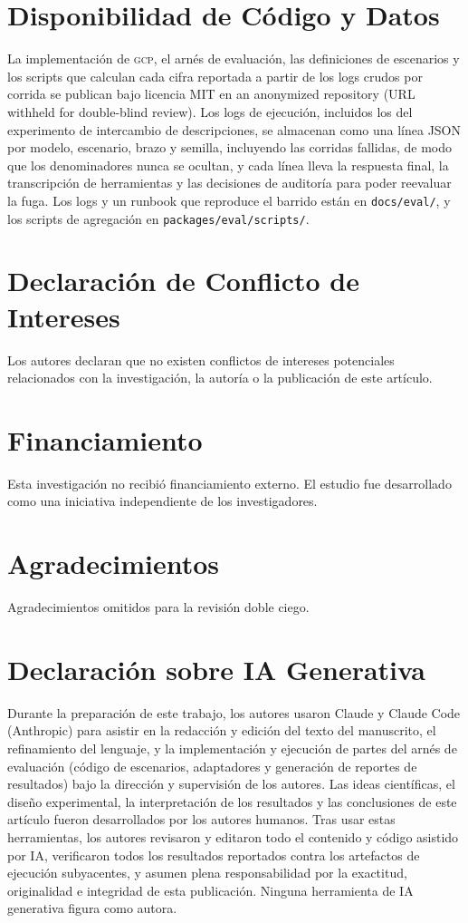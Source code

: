 \documentclass[conference,letterpaper]{IEEEtran}
\newcommand{\gcp}{\textsc{gcp}}
\begin{document}
\section*{Disponibilidad de Código y Datos}
\label{sec:availability}
La implementación de \gcp{}, el arnés de evaluación, las definiciones de escenarios y los scripts que calculan cada cifra reportada a partir de los logs crudos por corrida se publican bajo licencia MIT en
an anonymized repository (URL withheld for double-blind review). Los logs de ejecución, incluidos los del experimento de intercambio de
descripciones, se almacenan como una línea JSON por modelo, escenario, brazo y semilla, incluyendo las
corridas fallidas, de modo que los denominadores nunca se ocultan, y cada línea lleva la respuesta
final, la transcripción de herramientas y las decisiones de auditoría para poder reevaluar la fuga. Los logs y un runbook que reproduce el barrido están en \texttt{docs/eval/}, y los scripts de agregación en \texttt{packages/eval/scripts/}.

\section*{Declaraci\'on de Conflicto de Intereses}
Los autores declaran que no existen conflictos de intereses potenciales relacionados con la
investigaci\'on, la autor\'ia o la publicaci\'on de este art\'iculo.

\section*{Financiamiento}
Esta investigaci\'on no recibi\'o financiamiento externo. El estudio fue desarrollado como una
iniciativa independiente de los investigadores.

\section*{Agradecimientos}
Agradecimientos omitidos para la revisi\'on doble ciego.

\section*{Declaraci\'on sobre IA Generativa}
Durante la preparaci\'on de este trabajo, los autores usaron Claude y Claude Code (Anthropic) para
asistir en la redacci\'on y edici\'on del texto del manuscrito, el refinamiento del lenguaje, y la
implementaci\'on y ejecuci\'on de partes del arn\'es de evaluaci\'on (c\'odigo de escenarios,
adaptadores y generaci\'on de reportes de resultados) bajo la direcci\'on y supervisi\'on de los
autores. Las ideas cient\'ificas, el dise\~no experimental, la interpretaci\'on de los resultados y
las conclusiones de este art\'iculo fueron desarrollados por los autores humanos. Tras usar estas
herramientas, los autores revisaron y editaron todo el contenido y c\'odigo asistido por IA,
verificaron todos los resultados reportados contra los artefactos de ejecuci\'on subyacentes, y
asumen plena responsabilidad por la exactitud, originalidad e integridad de esta publicaci\'on.
Ninguna herramienta de IA generativa figura como autora.

\balance


\end{document}
